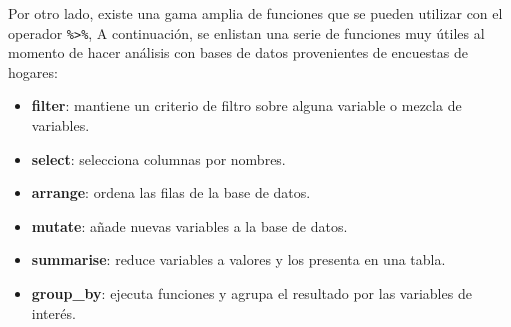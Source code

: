 \documentclass[
  12pt,
]{book}
\newenvironment{Shaded}{\begin{snugshade}}{\end{snugshade}}
\newcommand{\AttributeTok}[1]{\textcolor[rgb]{0.13,0.29,0.53}{#1}}
\newcommand{\DecValTok}[1]{\textcolor[rgb]{0.00,0.00,0.81}{#1}}
\newcommand{\FunctionTok}[1]{\textcolor[rgb]{0.13,0.29,0.53}{\textbf{#1}}}
\newcommand{\NormalTok}[1]{#1}
\newcommand{\OtherTok}[1]{\textcolor[rgb]{0.56,0.35,0.01}{#1}}
\newcommand{\SpecialCharTok}[1]{\textcolor[rgb]{0.81,0.36,0.00}{\textbf{#1}}}
\newcommand{\StringTok}[1]{\textcolor[rgb]{0.31,0.60,0.02}{#1}}
\providecommand{\tightlist}{%
  \setlength{\itemsep}{0pt}\setlength{\parskip}{0pt}}
\begin{document}
\begin{Shaded}
\end{Shaded}

Por otro lado, existe una gama amplia de funciones que se pueden utilizar con el operador \texttt{\%\textgreater{}\%}, A continuación, se enlistan una serie de funciones muy útiles al momento de hacer análisis con bases de datos provenientes de encuestas de hogares:

\begin{itemize}
\tightlist
\item
  \textbf{filter}: mantiene un criterio de filtro sobre alguna variable o mezcla de variables.
\item
  \textbf{select}: selecciona columnas por nombres.
\item
  \textbf{arrange}: ordena las filas de la base de datos.
\item
  \textbf{mutate}: añade nuevas variables a la base de datos.
\item
  \textbf{summarise}: reduce variables a valores y los presenta en una tabla.
\item
  \textbf{group\_by}: ejecuta funciones y agrupa el resultado por las variables de interés.
\end{itemize}
\end{document}
